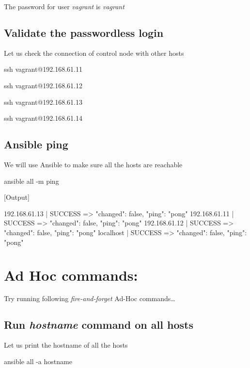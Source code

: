 The password for user \emph{vagrant} is \emph{vagrant}  

\subsection{Validate the passwordless login}

Let us check the connection of control node with other hosts

\begin{code}
ssh vagrant@192.168.61.11

ssh vagrant@192.168.61.12

ssh vagrant@192.168.61.13

ssh vagrant@192.168.61.14
\end{code}

\subsection{Ansible ping}

We will use Ansible to make sure all the hosts are reachable

\begin{code}
ansible all -m ping
\end{code}

[Output]\newline
\begin{code}
192.168.61.13 | SUCCESS => {
    "changed": false,
    "ping": "pong"
}
192.168.61.11 | SUCCESS => {
    "changed": false,
    "ping": "pong"
}
192.168.61.12 | SUCCESS => {
    "changed": false,
    "ping": "pong"
}
localhost | SUCCESS => {
    "changed": false,
    "ping": "pong"
}
\end{code}

\section{Ad Hoc commands:}

Try running following \emph{fire-and-forget} Ad-Hoc commands\ldots{}

\subsection{Run \emph{hostname} command on all hosts}

Let us print the hostname of all the hosts

\begin{code}
ansible all -a hostname
\end{code}

